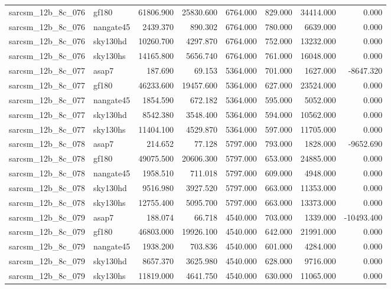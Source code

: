 \begin{tabular}{llrrrrrr}
sarcsm\_12b\_8c\_076 & gf180 & 61806.900 & 25830.600 & 6764.000 & 829.000 & 34414.000 & 0.000 \\
sarcsm\_12b\_8c\_076 & nangate45 & 2439.370 & 890.302 & 6764.000 & 780.000 & 6639.000 & 0.000 \\
sarcsm\_12b\_8c\_076 & sky130hd & 10260.700 & 4297.870 & 6764.000 & 752.000 & 13232.000 & 0.000 \\
sarcsm\_12b\_8c\_076 & sky130hs & 14165.800 & 5656.740 & 6764.000 & 761.000 & 16048.000 & 0.000 \\
sarcsm\_12b\_8c\_077 & asap7 & 187.690 & 69.153 & 5364.000 & 701.000 & 1627.000 & -8647.320 \\
sarcsm\_12b\_8c\_077 & gf180 & 46233.600 & 19457.600 & 5364.000 & 627.000 & 23524.000 & 0.000 \\
sarcsm\_12b\_8c\_077 & nangate45 & 1854.590 & 672.182 & 5364.000 & 595.000 & 5052.000 & 0.000 \\
sarcsm\_12b\_8c\_077 & sky130hd & 8542.380 & 3548.400 & 5364.000 & 594.000 & 10562.000 & 0.000 \\
sarcsm\_12b\_8c\_077 & sky130hs & 11404.100 & 4529.870 & 5364.000 & 597.000 & 11705.000 & 0.000 \\
sarcsm\_12b\_8c\_078 & asap7 & 214.652 & 77.128 & 5797.000 & 793.000 & 1828.000 & -9652.690 \\
sarcsm\_12b\_8c\_078 & gf180 & 49075.500 & 20606.300 & 5797.000 & 653.000 & 24885.000 & 0.000 \\
sarcsm\_12b\_8c\_078 & nangate45 & 1958.510 & 711.018 & 5797.000 & 609.000 & 4948.000 & 0.000 \\
sarcsm\_12b\_8c\_078 & sky130hd & 9516.980 & 3927.520 & 5797.000 & 663.000 & 11353.000 & 0.000 \\
sarcsm\_12b\_8c\_078 & sky130hs & 12755.400 & 5095.700 & 5797.000 & 663.000 & 13373.000 & 0.000 \\
sarcsm\_12b\_8c\_079 & asap7 & 188.074 & 66.718 & 4540.000 & 703.000 & 1339.000 & -10493.400 \\
sarcsm\_12b\_8c\_079 & gf180 & 46803.000 & 19926.100 & 4540.000 & 642.000 & 21991.000 & 0.000 \\
sarcsm\_12b\_8c\_079 & nangate45 & 1938.200 & 703.836 & 4540.000 & 601.000 & 4284.000 & 0.000 \\
sarcsm\_12b\_8c\_079 & sky130hd & 8657.370 & 3625.980 & 4540.000 & 628.000 & 9716.000 & 0.000 \\
sarcsm\_12b\_8c\_079 & sky130hs & 11819.000 & 4641.750 & 4540.000 & 630.000 & 11065.000 & 0.000 \\

\end{tabular}
